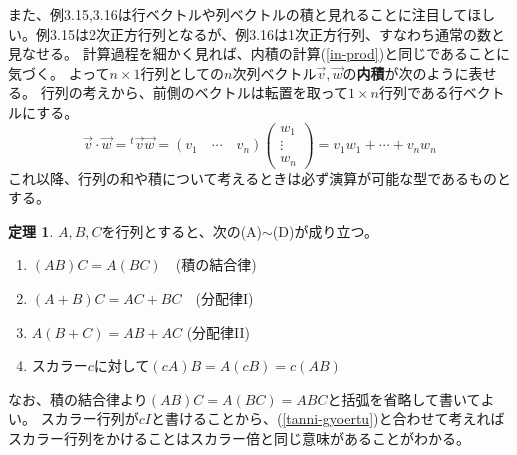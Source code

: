 \documentclass[10pt]{jsarticle}
\theoremstyle{definition}%
\newtheorem{thm}{定理}[section]%
\newcommand{\kakko}[1]{\left(#1 \right)} %
\newcommand{\vc}[1]{\overrightarrow{#1}}%
\numberwithin{equation}{section}%
\begin{document}
また、例3.15,3.16は行ベクトルや列ベクトルの積と見れることに注目してほしい。例3.15は2次正方行列となるが、例3.16は1次正方行列、すなわち通常の数と見なせる。
計算過程を細かく見れば、内積の計算(\ref{in-prod})と同じであることに気づく。
よって$n\times 1$行列としての$n$次列ベクトル$\vc{v},\vc{w}$の{\bf 内積}が次のように表せる。
行列の考えから、前側のベクトルは転置を取って$1\times n$行列である行ベクトルにする。
\begin{equation}
  \vc{v}\cdot\vc{w}={}^{t}\vc{v}\vc{w}=\kakko{v_{1} \quad \cdots \quad v_{n} }
  \kakko{\begin{matrix}
    w_{1}\\
    \vdots \\
    w_{n}
  \end{matrix}
  }=v_{1}w_{1}+\cdots +v_{n}w_{n}
\end{equation}
これ以降、行列の和や積について考えるときは必ず演算が可能な型であるものとする。
\begin{screen}
  \begin{thm}
    $A,B,C$を行列とすると、次の(A)$\sim$(D)が成り立つ。
    \begin{enumerate}
      \item $(AB)C=A(BC)$　(積の結合律) 
      \item $(A+B)C=AC+BC$　(分配律I)
      \item $A(B+C)=AB+AC$ (分配律II)
      \item スカラー$c$に対して$(cA)B=A(cB)=c(AB)$
    \end{enumerate}
  \end{thm}
\end{screen}
なお、積の結合律より$(AB)C=A(BC)=ABC$と括弧を省略して書いてよい。
スカラー行列が$cI$と書けることから、(\ref{tanni-gyoertu})と合わせて考えればスカラー行列をかけることはスカラー倍と同じ意味があることがわかる。
\end{document}

